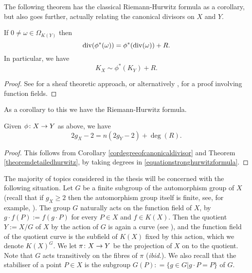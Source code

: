 \begin{cor}
The following theorem has the classical Riemann-Hurwitz formula as a corollary, but also goes further, actually relating the canonical divisors on $X$ and $Y$.
    \begin{thm}\label{theoremdetailedhurwitz}
    If $0 \neq \omega \in \Omega_{K(Y)}$ then
        \begin{equation}\label{equationstronghurwitzformula}
        \operatorname{div}(\phi^*(\omega)) = \phi^*(\operatorname{div}(\omega)) + R.
        \end{equation}
    In particular, we have
        \[
        K_X \sim \phi^*(K_Y) + R.
        \]
    \end{thm}
    \begin{proof}
    See \cite[Chap.\ IV, \S 2, Prop.\ 2.3]{hart} for a sheaf theoretic approach, or alternatively \cite[Thm. 3.4.6]{stichtenoth}, for a proof involving function fields.
    \end{proof}


As a corollary to this we have the Riemann-Hurwitz formula.
    \begin{cor}\label{corhurwitzformula}
    Given $\phi \colon X \rightarrow Y$ as above, we have
        \[
        2g_X - 2 = n(2g_Y -2) + \deg(R).
        \]
    \end{cor}
    \begin{proof}
    This follows from Corollary \ref{cordegreeofcanonicaldivisor} and Theorem \ref{theoremdetailedhurwitz}, by taking degrees in \eqref{equationstronghurwitzformula}.
    \end{proof}

The majority of topics considered in the thesis will be concerned with the following situation.
Let $G$ be a finite subgroup of the automorphism group of $X$ (recall that if $g_X \geq 2$ then the automorphism group itself is finite, see, for example, \cite{finiteautomorphismofcurves}).
The group $G$ naturally acts on the function field of $X$, by $g\cdot f(P) := f(g \cdot P)$ for every $P \in X$ and $f \in K(X)$.
Then the quotient $Y := X/G$ of $X$ by the action of $G$ is again a curve (see \cite[Chap.\ 2, \S 1.7, Ex.\ 8]{pretendshafarevichalggeom1}), and the function field of the quotient curve is the subfield of $K(X)$ fixed by this action, which we denote $K(X)^G$.
We let $\pi \colon X \rightarrow Y$ be the projection of $X$ on to the quotient.
Note that $G$ acts transitively on the fibres of $\pi$ (\textit{ibid.}).
We also recall that the stabiliser of a point $P \in X$ is the subgroup $G(P) : = \{ g \in G | g \cdot P = P\}$ of $G$.



\end{cor}
